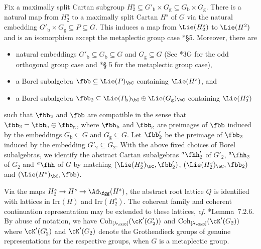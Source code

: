 \documentclass[12pt,a4paper]{amsart}
\def\subset{\subseteq}
\numberwithin{equation}{section}
\theoremstyle{remark}
\def\cf{\emph{cf.} }
\def\Irr{\mathrm{Irr}}
\def\Lamck{[\lambda_\ckcO]}
\def\hha{{}^a\fhh}
\def\ahh{\hha}
\def\Coh{\mathrm{Coh}}
\def\Gb{G_{\mathrm b}}
\def\Gpb{G'_{\mathrm b}}
\def\Pb{P_{\mathrm b}}
\def\Gg{G_{\mathrm g}}
\begin{document}
  Fix a maximally split Cartan subgroup
  $H_{2}^{s}\subset\Gpb\times \Gg\subset \Gb\times \Gg$.
  There is a natural map from $H_{2}^{s}$ to a maximally split Cartan $H^{s}$ of $G$ via the natural
  embedding $\Gpb\times \Gg \subseteq P\subseteq G$. This induces a map from $\Lie(H_{2}^{s})$ to $\Lie(H^{2})$ and is an isomorphism
  except the metaplectic group case \cite{RT2}*{\S 5}. Moreover, there are
\begin{itemize}
  \item natural embeddings $\Gpb\subseteq \Gb\subseteq G$ and $\Gg\subseteq G$
        (See \cite{GI}*{3G} for the odd orthogonal group case and \cite{RT2}*{\S
        5} for the metaplectic group case),
  \item a Borel subalgebra $\fbb\subseteq \Lie(P)_{\bC}$ containing
  $\Lie(H^{s})$, and
  \item a Borel subalgebra  $\fbb_{2}\subseteq \Lie(\Pb)_{\bC}\oplus \Lie(\Gg)_{\bC}$ containing
  $\Lie(H_{2}^{s})$
\end{itemize}
  such that $\fbb_{2}$ and $\fbb$ are compatible in the sense that
  $\fbb_{2}=\fbb_{\mathrm b}\oplus \fbb_{\mathrm g}$, where $\fbb_{\mathrm b}$
  and $\fbb_{\mathrm g}$ are preimages of $\fbb$ induced by the embeddings
  $\Gb\subseteq G$ and $\Gg\subseteq G$.
  Let  $\fbb'_{2}$ be the preimage of $\fbb_{2}$
  induced by the embedding $G'_{2} \subset G_{2}$.
  With the above fixed choices of Borel subalgebras, we identify the abstract Cartan subalgebras
  $\ahh'_{2}$ of $G'_{2}$, $\ahh_{2}$ of $G_{2}$ and $\ahh$ of $G$
  by matching $(\Lie(H^{s}_{2})_{\bC},\fbb'_{2})$,
  $(\Lie(H_{2}^{s})_{\bC},\fbb_{2})$  and $(\Lie(H^{s})_{\bC},\fbb)$.

  Via the maps $H^{s}_{2}\rightarrow H^{s}\rightarrow \Ad_{\fgg}(H^{s})$, the abstract
  root lattice $Q$ is identified with lattices in $\Irr(H)$ and $\Irr(H^{s}_{2})$.
  The coherent family and coherent continuation representation may be extended to these lattices, \cf \cite{Vg}*{Lemma~7.2.6}.
  By abuse of notation, we have $\Coh_{\Lamck}(\cK'(G'_{2}))$ and $\Coh_{\Lamck}(\cK'(G_{2}))$ where
  $\cK'(G'_{2})$
  and $\cK'(G_{2})$ denote the Grothendieck groups of genuine representations for the respective groups,
  when $G$ is a metaplectic group.
\end{document}
